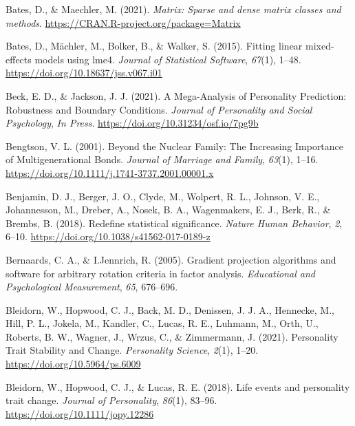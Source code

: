 \documentclass[
  english,
  man,floatsintext]{apa7}
\begin{document}
\leavevmode\hypertarget{ref-R-Matrix}{}%
Bates, D., \& Maechler, M. (2021). \emph{Matrix: Sparse and dense matrix classes and methods}. \url{https://CRAN.R-project.org/package=Matrix}

\leavevmode\hypertarget{ref-R-lme4}{}%
Bates, D., Mächler, M., Bolker, B., \& Walker, S. (2015). Fitting linear mixed-effects models using lme4. \emph{Journal of Statistical Software}, \emph{67}(1), 1--48. \url{https://doi.org/10.18637/jss.v067.i01}

\leavevmode\hypertarget{ref-beckMegaAnalysisPersonalityPrediction2021}{}%
Beck, E. D., \& Jackson, J. J. (2021). A Mega-Analysis of Personality Prediction: Robustness and Boundary Conditions. \emph{Journal of Personality and Social Psychology}, \emph{In Press}. \url{https://doi.org/10.31234/osf.io/7pg9b}

\leavevmode\hypertarget{ref-bengtsonNuclearFamilyIncreasing2001}{}%
Bengtson, V. L. (2001). Beyond the Nuclear Family: The Increasing Importance of Multigenerational Bonds. \emph{Journal of Marriage and Family}, \emph{63}(1), 1--16. \url{https://doi.org/10.1111/j.1741-3737.2001.00001.x}

\leavevmode\hypertarget{ref-benjaminRedefineStatisticalSignificance2018}{}%
Benjamin, D. J., Berger, J. O., Clyde, M., Wolpert, R. L., Johnson, V. E., Johannesson, M., Dreber, A., Nosek, B. A., Wagenmakers, E. J., Berk, R., \& Brembs, B. (2018). Redefine statistical significance. \emph{Nature Human Behavior}, \emph{2}, 6--10. \url{https://doi.org/10.1038/s41562-017-0189-z}

\leavevmode\hypertarget{ref-R-GPArotation}{}%
Bernaards, C. A., \& I.Jennrich, R. (2005). Gradient projection algorithms and software for arbitrary rotation criteria in factor analysis. \emph{Educational and Psychological Measurement}, \emph{65}, 676--696.

\leavevmode\hypertarget{ref-bleidornPersonalityTraitStability2021}{}%
Bleidorn, W., Hopwood, C. J., Back, M. D., Denissen, J. J. A., Hennecke, M., Hill, P. L., Jokela, M., Kandler, C., Lucas, R. E., Luhmann, M., Orth, U., Roberts, B. W., Wagner, J., Wrzus, C., \& Zimmermann, J. (2021). Personality Trait Stability and Change. \emph{Personality Science}, \emph{2}(1), 1--20. \url{https://doi.org/10.5964/ps.6009}

\leavevmode\hypertarget{ref-bleidornLifeEventsPersonality2018}{}%
Bleidorn, W., Hopwood, C. J., \& Lucas, R. E. (2018). Life events and personality trait change. \emph{Journal of Personality}, \emph{86}(1), 83--96. \url{https://doi.org/10.1111/jopy.12286}
\end{document}
